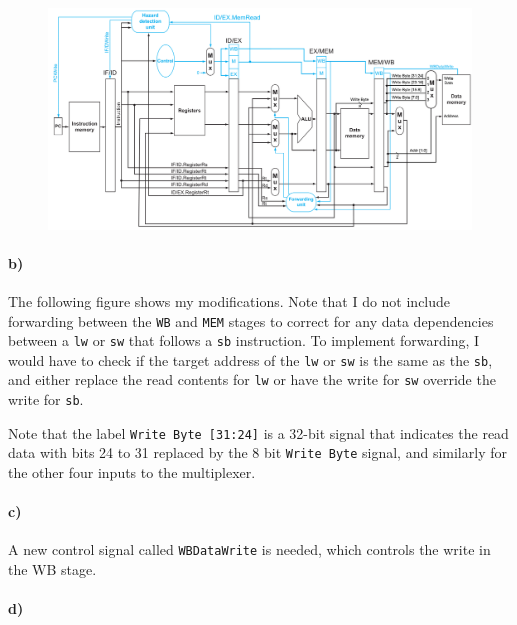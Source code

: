 \documentclass[12pt]{article}
\begin{document}
\begin{figure}[!ht]
        \begin{center}
                \hspace*{-4cm}
                \includegraphics[width=6.5in]{problem4b.png}
                \hspace*{-4cm}
        \end{center}
\end{figure}

\paragraph{b)}

The following figure shows my modifications. Note that I do not include forwarding between the \texttt{WB} and \texttt{MEM} stages to correct for any data dependencies
between a \texttt{lw} or \texttt{sw} that follows a \texttt{sb} instruction. To implement forwarding, I would have to check if the target address of the \texttt{lw} or
\texttt{sw} is the same as the \texttt{sb}, and either replace the read contents for \texttt{lw} or have the write for \texttt{sw} override the write for \texttt{sb}.

Note that the label \texttt{Write Byte [31:24]} is a 32-bit signal that indicates the read data with bits 24 to 31 replaced by the 8 bit \texttt{Write Byte} signal, and
similarly for the other four inputs to the multiplexer.

\paragraph{c)}

A new control signal called \texttt{WBDataWrite} is needed, which controls the write in the WB stage.

\paragraph{d)}
\end{document}
